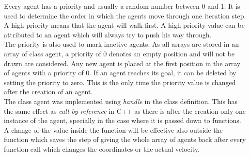 \noi Every agent has a priority and usually a random number between 0 and 1. It is used to determine the order in which the agents move through one iteration step. A high priority means that the agent will walk first. A high priority value can be attributed to an agent which will always try to push his way through.\\
The priority is also used to mark inactive agents. As all arrays are stored in an array of class agent, a priority of 0 denotes an empty position and will not be drawn are considered. Any new agent is placed at the first position in the array of agents with a priority of 0. If an agent reaches its goal, it can be deleted by setting the priority to zero. This is the only time the priority value is changed after the creation of an agent.\\

\noi The class agent was implemented using \textit{handle} in the class definition. This has the same effect as \textit{call by reference} in C++ as there is after the creation only one instance of the agent, specially in the case where it is passed down to functions. A change of the value inside the function will be effective also outside the function which saves the step of giving the whole array of agents back after every function call which changes the coordinates or the actual velocity.




